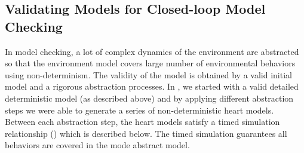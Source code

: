 
\subsection{Validating Models for Closed-loop Model Checking}
In model checking, a lot of complex dynamics of the environment are abstracted so that the environment model covers large number of environmental behaviors using non-determinism. The validity of the model is obtained by a valid initial model and a rigorous abstraction processes. In \cite{STTT13}, we started with a valid detailed deterministic model (as described above) and by applying different abstraction steps we were able to generate a series of non-deterministic heart models. Between each abstraction step, the heart models satisfy a timed simulation relationship (\cite{simulation}) which is described below. The timed simulation guarantees all behaviors are covered in the mode abstract model.

